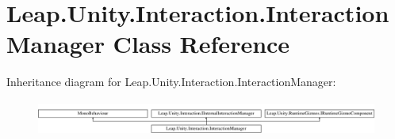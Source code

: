 \hypertarget{class_leap_1_1_unity_1_1_interaction_1_1_interaction_manager}{}\section{Leap.\+Unity.\+Interaction.\+Interaction\+Manager Class Reference}
\label{class_leap_1_1_unity_1_1_interaction_1_1_interaction_manager}
Inheritance diagram for Leap.\+Unity.\+Interaction.\+Interaction\+Manager\+:\begin{figure}[H]
\begin{center}
\leavevmode
\includegraphics[height=1.181435cm]{class_leap_1_1_unity_1_1_interaction_1_1_interaction_manager}
\end{center}
\end{figure}
